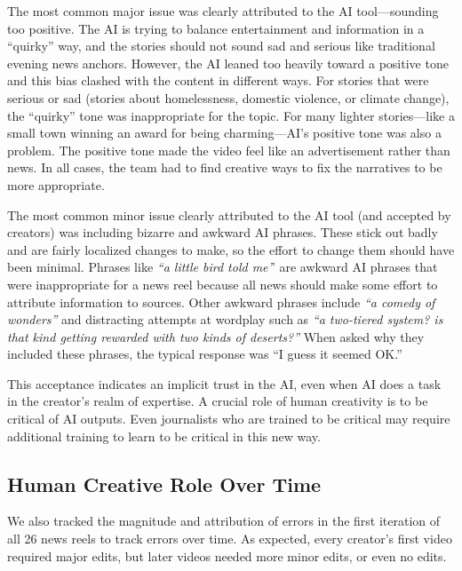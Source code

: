 The most common major issue was clearly attributed to the AI tool---sounding too positive. 
The AI is trying to balance entertainment and information in a ``quirky'' way, and the stories should not sound sad and serious like traditional evening news anchors.
However, the AI leaned too heavily toward a positive tone and this bias clashed with the content in different ways. 
For stories that were serious or sad (stories about homelessness, domestic violence, or climate change), the ``quirky'' tone was inappropriate for the topic. 
For many lighter stories---like a small town winning an award for being charming---AI's positive tone was also a problem. 
The positive tone made the video feel like an advertisement rather than news. 
In all cases, the team had to find creative ways to fix the narratives to be more appropriate. 

The most common minor issue clearly attributed to the AI tool (and accepted by creators) was including bizarre and awkward AI phrases.
These stick out badly and are fairly localized changes to make, so the effort to change them should have been minimal. 
Phrases like \textit{``a little bird told me'}' are awkward AI phrases that were inappropriate for a news reel because all news should make some effort to attribute information to sources. 
Other awkward phrases include \textit{``a comedy of wonders''} and distracting attempts at wordplay such as \textit{``a two-tiered system? is that kind getting rewarded with two kinds of deserts?''}
When asked why they included these phrases, the typical response was ``I guess it seemed OK.''

This acceptance indicates an implicit trust in the AI, even when AI does a task in the creator's realm of expertise. 
A crucial role of human creativity is to be critical of AI outputs.
Even journalists who are trained to be critical may require additional training to learn to be critical in this new way.


\subsection{Human Creative Role Over Time}
We also tracked the magnitude and attribution of errors in the first iteration of all 26 news reels to track errors over time. 
As expected, every creator's first video required major edits, but later videos needed more minor edits, or even no edits.

\color{black}

